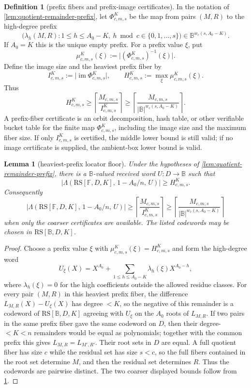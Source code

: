 \documentclass[11pt]{article}
\newtheorem{lemma}[lemma]{Lemma}
\theoremstyle{definition}
\newtheorem{definition}[definition]{Definition}
\theoremstyle{remark}
\newcommand{\F}{\mathbb{F}}
\newcommand{\B}{\mathbb{B}}
\newcommand{\RS}{\mathrm{RS}}
\newcommand{\Lst}{\Lambda}
\begin{document}
\begin{definition}[prefix fibers and prefix-image certificates]
\label{def:prefix-fiber-certificate}
In the notation of \cref{lem:quotient-remainder-prefix}, let
$\Phi_{c,m,s}^{K}$ be the map from pairs $(M,R)$ to the high-degree prefix
\[
        \bigl(\lambda_h(M,R):1\le h\le A_0-K,
              \ h\bmod c\in\{0,1,\ldots,s\}\bigr)
        \in \B^{w_c(s,A_0-K)} .
\]
If $A_0=K$ this is the unique empty prefix.  For a prefix value $\xi$, put
\[
        \mu_{c,m,s}^{K}(\xi)
        :=\bigl| (\Phi_{c,m,s}^{K})^{-1}(\xi)\bigr|.
\]
Define the image size and the heaviest prefix fiber by
\[
        I_{c,m,s}^{K}:=\bigl|\operatorname{im}\Phi_{c,m,s}^{K}\bigr|,
        \qquad
        H_{c,m,s}^{K}:=\max_{\xi}\mu_{c,m,s}^{K}(\xi).
\]
Thus
\[
        H_{c,m,s}^{K}
        \ge
        \left\lceil\frac{M_{c,m,s}}{I_{c,m,s}^{K}}\right\rceil
        \ge
        \left\lceil\frac{M_{c,m,s}}{|\B|^{w_c(s,A_0-K)}}\right\rceil .
\]
A prefix-fiber certificate is an orbit decomposition, hash table, or other
verifiable bucket table for the finite map $\Phi_{c,m,s}^{K}$, including the
image size and the maximum fiber size.  If only $I_{c,m,s}^{K}$ is certified,
the middle lower bound is still valid; if no image certificate is supplied, the
ambient-box lower bound is valid.
\end{definition}

\begin{lemma}[heaviest-prefix locator floor]
\label{lem:heaviest-prefix-locator-floor}
Under the hypotheses of \cref{lem:quotient-remainder-prefix}, there is a
$\B$-valued received word $U:D\to\B$ such that
\[
        \bigl|\Lst(\RS[\F,D,K],\,1-A_0/n,\,U)\bigr|
        \ge H_{c,m,s}^{K}.
\]
Consequently
\[
        \bigl|\Lst(\RS[\F,D,K],\,1-A_0/n,\,U)\bigr|
        \ge
        \left\lceil \frac{M_{c,m,s}}{I_{c,m,s}^{K}}\right\rceil
        \ge
        \left\lceil \frac{M_{c,m,s}}{|\B|^{w_c(s,A_0-K)}}\right\rceil
\]
when only the coarser certificates are available.  The listed codewords may be
chosen in $\RS[\B,D,K]$.
\end{lemma}

\begin{proof}
Choose a prefix value $\xi$ with
$\mu_{c,m,s}^{K}(\xi)=H_{c,m,s}^{K}$ and form the high-degree word
\[
        U_\xi(X)=X^{A_0}+\sum_{1\le h\le A_0-K}
        \lambda_h(\xi)X^{A_0-h},
\]
where $\lambda_h(\xi)=0$ for the high coefficients outside the allowed
residue classes.  For every pair $(M,R)$ in this heaviest prefix fiber, the difference
$L_{M,R}(X)-U_\xi(X)$ has degree $<K$, so the negative of this remainder is a
codeword of $\RS[\B,D,K]$ agreeing with $U_\xi$ on the $A_0$ roots of
$L_{M,R}$.  If two pairs in the same prefix fiber gave the same codeword on
$D$, then their degree-$<K<n$ remainders would be equal as polynomials; together
with the common prefix this gives $L_{M,R}=L_{M',R'}$.  Their root sets in $D$
are equal.  A full quotient fiber has size $c$ while the residual set has size
$s<c$, so the full fibers contained in the root set determine $M$, and then the
residual set determines $R$.  Thus the codewords are pairwise distinct.  The two
coarser displayed bounds follow from \cref{def:prefix-fiber-certificate}.
\end{proof}
\end{document}
